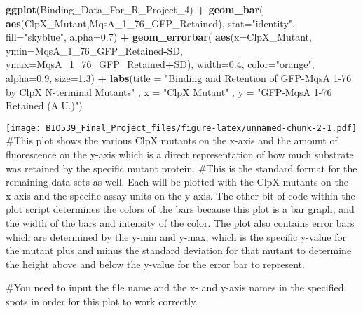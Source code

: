 \documentclass[]{article}
\newenvironment{Shaded}{\begin{snugshade}}{\end{snugshade}}
\newcommand{\DataTypeTok}[1]{\textcolor[rgb]{0.13,0.29,0.53}{#1}}
\newcommand{\DecValTok}[1]{\textcolor[rgb]{0.00,0.00,0.81}{#1}}
\newcommand{\FloatTok}[1]{\textcolor[rgb]{0.00,0.00,0.81}{#1}}
\newcommand{\KeywordTok}[1]{\textcolor[rgb]{0.13,0.29,0.53}{\textbf{#1}}}
\newcommand{\NormalTok}[1]{#1}
\newcommand{\OperatorTok}[1]{\textcolor[rgb]{0.81,0.36,0.00}{\textbf{#1}}}
\newcommand{\StringTok}[1]{\textcolor[rgb]{0.31,0.60,0.02}{#1}}
\begin{document}
\begin{Shaded}
\begin{Highlighting}[]
\KeywordTok{ggplot}\NormalTok{(Binding_Data_For_R_Project_}\DecValTok{4}\NormalTok{) }\OperatorTok{+}\StringTok{ }
\StringTok{  }\KeywordTok{geom_bar}\NormalTok{( }\KeywordTok{aes}\NormalTok{(ClpX_Mutant,MqsA_}\DecValTok{1}\NormalTok{_}\DecValTok{76}\NormalTok{_GFP_Retained), }\DataTypeTok{stat=}\StringTok{"identity"}\NormalTok{, }\DataTypeTok{fill=}\StringTok{"skyblue"}\NormalTok{, }\DataTypeTok{alpha=}\FloatTok{0.7}\NormalTok{) }\OperatorTok{+}
\StringTok{  }\KeywordTok{geom_errorbar}\NormalTok{( }\KeywordTok{aes}\NormalTok{(}\DataTypeTok{x=}\NormalTok{ClpX_Mutant, }\DataTypeTok{ymin=}\NormalTok{MqsA_}\DecValTok{1}\NormalTok{_}\DecValTok{76}\NormalTok{_GFP_Retained}\OperatorTok{-}\NormalTok{SD, }\DataTypeTok{ymax=}\NormalTok{MqsA_}\DecValTok{1}\NormalTok{_}\DecValTok{76}\NormalTok{_GFP_Retained}\OperatorTok{+}\NormalTok{SD),}
                 \DataTypeTok{width=}\FloatTok{0.4}\NormalTok{, }\DataTypeTok{color=}\StringTok{"orange"}\NormalTok{, }\DataTypeTok{alpha=}\FloatTok{0.9}\NormalTok{, }\DataTypeTok{size=}\FloatTok{1.3}\NormalTok{) }\OperatorTok{+}
\StringTok{  }\KeywordTok{labs}\NormalTok{(}\DataTypeTok{title =} \StringTok{"Binding and Retention of GFP-MqsA 1-76 by ClpX N-terminal Mutants"}\NormalTok{ , }
       \DataTypeTok{x =} \StringTok{"ClpX Mutant"}\NormalTok{ , }\DataTypeTok{y =} \StringTok{"GFP-MqsA 1-76 Retained (A.U.)"}\NormalTok{)}
\end{Highlighting}
\end{Shaded}

\texttt{[image: BIO539\_Final\_Project\_files/figure-latex/unnamed-chunk-2-1.pdf]}
\#This plot shows the various ClpX mutants on the x-axis and the amount
of fluorescence on the y-axis which is a direct representation of how
much substrate was retained by the specific mutant protein. \#This is
the standard format for the remaining data sets as well. Each will be
plotted with the ClpX mutants on the x-axis and the specific assay units
on the y-axis. The other bit of code within the plot script determines
the colors of the bars because this plot is a bar graph, and the width
of the bars and intensity of the color. The plot also contains error
bars which are determined by the y-min and y-max, which is the specific
y-value for the mutant plus and minus the standard deviation for that
mutant to determine the height above and below the y-value for the error
bar to represent.

\#You need to input the file name and the x- and y-axis names in the
specified spots in order for this plot to work correctly.
\end{document}
